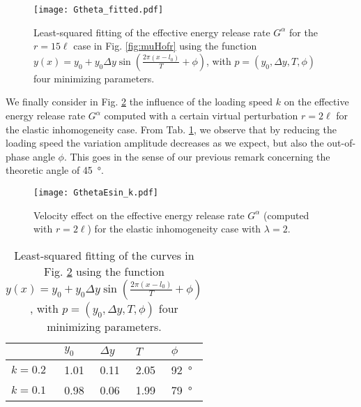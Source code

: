 \begin{figure}[htbp]
\centering
\texttt{[image: Gtheta\_fitted.pdf]}
\caption{Least-squared fitting of the effective energy release rate $G^\alpha$ for the $r=15\ell$ case in Fig. \ref{fig:muHofr} using the function $y(x)=y_0+y_0\Delta y\sin(\frac{2\pi(x-l_0)}{T}+\phi)$, with $p=(y_0, \Delta y, T, \phi)$ four minimizing parameters.} \label{fig:Gtheta_fitted}
\end{figure}

We finally consider in Fig. \ref{fig:Gtheta_k} the influence of the loading speed $k$ on the effective energy release rate $G^\alpha$ computed with a certain virtual perturbation $r=2\ell$ for the elastic inhomogeneity case. From Tab. \ref{tab:fitting2}, we observe that by reducing the loading speed the variation amplitude decreases as we expect, but also the out-of-phase angle $\phi$. This goes in the sense of our previous remark concerning the theoretic angle of \SI{45}{\degree}.
\begin{figure}[htbp]
\centering
\texttt{[image: GthetaEsin\_k.pdf]}
\caption{Velocity effect on the effective energy release rate $G^\alpha$ (computed with $r=2\ell$) for the elastic inhomogeneity case with $\lambda=2$.} \label{fig:Gtheta_k}
\end{figure}
\begin{table}[htbp]
\centering
\caption{Least-squared fitting of the curves in Fig. \ref{fig:Gtheta_k} using the function $y(x)=y_0+y_0\Delta y\sin(\frac{2\pi(x-l_0)}{T}+\phi)$, with $p=(y_0, \Delta y, T, \phi)$ four minimizing parameters.} \label{tab:fitting2}
\begin{tabular}{lllll} \toprule
& $y_0$ & $\Delta y$ & $T$ & $\phi$ \\ \midrule
$k=0.2$ & 1.01 & 0.11 & 2.05 & \SI{92}{\degree} \\
$k=0.1$ & 0.98 & 0.06 & 1.99 & \SI{79}{\degree} \\ \bottomrule
\end{tabular}
\end{table}

